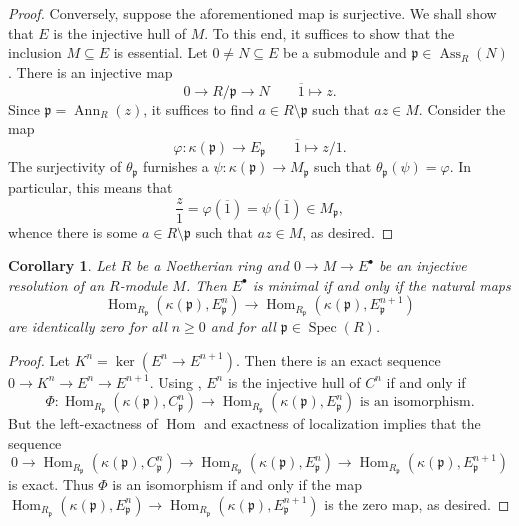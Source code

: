 \documentclass[10pt]{article}
\theoremstyle{thmstyle}
\theoremstyle{defstyle}
\newtheorem{corollary}[theorem]{Corollary}
\newcommand{\Spec}{\operatorname{Spec}}
\newcommand{\Ann}{\operatorname{Ann}}
\newcommand{\Hom}{\operatorname{Hom}}
\newcommand{\frakp}{\mathfrak{p}} %
\renewcommand{\ge}{\geqslant}
\newcommand{\Ass}{\operatorname{Ass}}
\begin{document}
\begin{proof}
    Conversely, suppose the aforementioned map is surjective. We shall show that $E$ is the injective hull of $M$. To this end, it suffices to show that the inclusion $M\subseteq E$ is essential. Let $0\ne N\subseteq E$ be a submodule and $\frakp\in\Ass_R(N)$. There is an injective map 
    \begin{equation*}
        0\to R/\frakp\longrightarrow N\qquad \overline 1\longmapsto z.
    \end{equation*}
    Since $\frakp = \Ann_R(z)$, it suffices to find $a\in R\setminus\frakp$ such that $az\in M$. Consider the map 
    \begin{equation*}
        \varphi: \kappa(\frakp)\longrightarrow E_\frakp\qquad \overline 1\longmapsto z/1.
    \end{equation*}
    The surjectivity of $\theta_\frakp$ furnishes a $\psi: \kappa(\frakp)\to M_\frakp$ such that $\theta_\frakp(\psi) = \varphi$. In particular, this means that 
    \begin{equation*}
        \frac{z}{1} = \varphi(\overline 1) = \psi(\overline 1)\in M_\frakp,
    \end{equation*}
    whence there is some $a\in R\setminus\frakp$ such that $az\in M$, as desired.
\end{proof}

\begin{corollary}
    Let $R$ be a Noetherian ring and $0\to M\to E^\bullet$ be an injective resolution of an $R$-module $M$. Then $E^\bullet$ is minimal if and only if the natural maps 
    \begin{equation*}
        \Hom_{R_\frakp}\left(\kappa(\frakp), E^n_\frakp\right)\longrightarrow\Hom_{R_\frakp}\left(\kappa(\frakp), E^{n + 1}_\frakp\right)
    \end{equation*}
    are identically zero for all $n\ge 0$ and for all $\frakp\in\Spec(R)$.
\end{corollary}
\begin{proof}
    Let $K^n = \ker\left(E^n\to E^{n + 1}\right)$. Then there is an exact sequence $0\to K^n\to E^n\to E^{n + 1}$. Using , $E^n$ is the injective hull of $C^n$ if and only if 
    \begin{equation*}
        \Phi: \Hom_{R_\frakp}\left(\kappa(\frakp), C^n_\frakp\right)\to \Hom_{R_\frakp}\left(\kappa(\frakp), E^{n}_\frakp\right)\text{ is an isomorphism}.
    \end{equation*}
    But the left-exactness of $\Hom$ and exactness of localization implies that the sequence 
    \begin{equation*}
        0\to\Hom_{R_\frakp}\left(\kappa(\frakp), C^n_\frakp\right)\to\Hom_{R_\frakp}\left(\kappa(\frakp), E^{n}_\frakp\right)\to\Hom_{R_\frakp}\left(\kappa(\frakp), E^{n + 1}_\frakp\right)
    \end{equation*}
    is exact. Thus $\Phi$ is an isomorphism if and only if the map $\Hom_{R_\frakp}\left(\kappa(\frakp), E^{n}_\frakp\right)\to\Hom_{R_\frakp}\left(\kappa(\frakp), E^{n + 1}_\frakp\right)$ is the zero map, as desired.
\end{proof}
\end{document}
